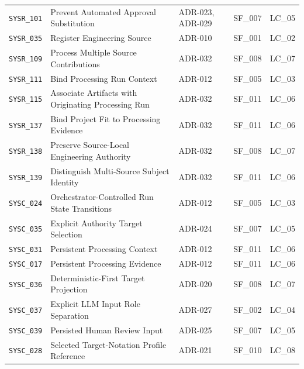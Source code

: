 \begin{xltabular}{\textwidth}{@{}p{1.65cm}X p{2.25cm}p{2.0cm}p{1.7cm}@{}}
\texttt{SYSR\_101} & Prevent Automated Approval Substitution & ADR-023, ADR-029 & SF\_007 & LC\_05\\

\texttt{SYSR\_035} & Register Engineering Source & ADR-010 & SF\_001 & LC\_02\\

\texttt{SYSR\_109} & Process Multiple Source Contributions & ADR-032 & SF\_008 & LC\_07\\

\texttt{SYSR\_111} & Bind Processing Run Context & ADR-012 & SF\_005 & LC\_03\\

\texttt{SYSR\_115} & Associate Artifacts with Originating Processing Run & ADR-032 & SF\_011 & LC\_06\\

\texttt{SYSR\_137} & Bind Project Fit to Processing Evidence & ADR-032 & SF\_011 & LC\_06\\

\texttt{SYSR\_138} & Preserve Source-Local Engineering Authority & ADR-032 & SF\_008 & LC\_07\\

\texttt{SYSR\_139} & Distinguish Multi-Source Subject Identity & ADR-032 & SF\_011 & LC\_06\\

\texttt{SYSC\_024} & Orchestrator-Controlled Run State Transitions & ADR-012 & SF\_005 & LC\_03\\

\texttt{SYSC\_035} & Explicit Authority Target Selection & ADR-024 & SF\_007 & LC\_05\\

\texttt{SYSC\_031} & Persistent Processing Context & ADR-012 & SF\_011 & LC\_06\\

\texttt{SYSC\_017} & Persistent Processing Evidence & ADR-012 & SF\_011 & LC\_06\\

\texttt{SYSC\_036} & Deterministic-First Target Projection & ADR-020 & SF\_008 & LC\_07\\

\texttt{SYSC\_037} & Explicit LLM Input Role Separation & ADR-027 & SF\_002 & LC\_04\\

\texttt{SYSC\_039} & Persisted Human Review Input & ADR-025 & SF\_007 & LC\_05\\

\texttt{SYSC\_028} & Selected Target-Notation Profile Reference & ADR-021 & SF\_010 & LC\_08\\


\end{xltabular}
